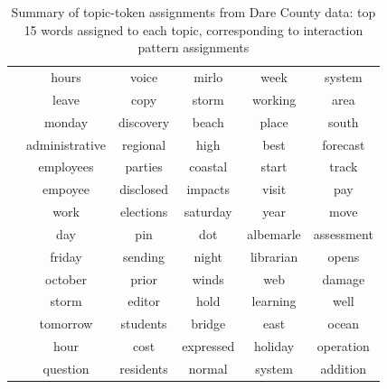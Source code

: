\documentclass[a4paper]{article}
\begin{document}
\begin{table}[ht]
{\begin{tabular}{ |c||c|c|c|c|c|}
          					& hours & voice & mirlo & week & system \\
          					& leave & copy& storm &  working & area \\
          					& monday & discovery & beach & place & south \\
          					& administrative & regional & high & best & forecast \\
          					& employees & parties & coastal & start & track \\
          					& empoyee & disclosed & impacts & visit & pay \\
          					& work & elections & saturday & year & move \\
          					& day & pin & dot & albemarle & assessment \\
          					& friday & sending & night & librarian & opens \\
          					& october & prior & winds & web & damage\\
          					& storm &editor & hold & learning & well\\
          					& tomorrow & students & bridge & east& ocean\\
          					& hour & cost & expressed & holiday &  operation\\
          					& question & residents & normal & system & addition
          					\\
          					\hline            				
          				\end{tabular}}
          				\label{table:TableDare}
          				\caption{Summary of topic-token assignments from Dare County data: top 15 words assigned to each topic, corresponding to interaction pattern assignments}               			
          			\end{table} 
          			
\end{document}
